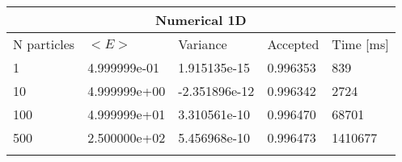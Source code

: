 \begin{tabular}{|l|l|l|l|l|}
\hline 
\multicolumn{5}{|c|}{Numerical 1D}\\ 
\hline 
N particles & $<E>$ & Variance & Accepted & Time [ms]\\ 
 \hline 
1 & 4.999999e-01 & 1.915135e-15 & 0.996353 & 839 \\ \hline 
10 & 4.999999e+00 & -2.351896e-12 & 0.996342 & 2724 \\ \hline 
100 & 4.999999e+01 & 3.310561e-10 & 0.996470 & 68701 \\ \hline 
500 & 2.500000e+02 & 5.456968e-10 & 0.996473 & 1410677 \\ \hline 
\label{i:n1} 
\end{tabular}